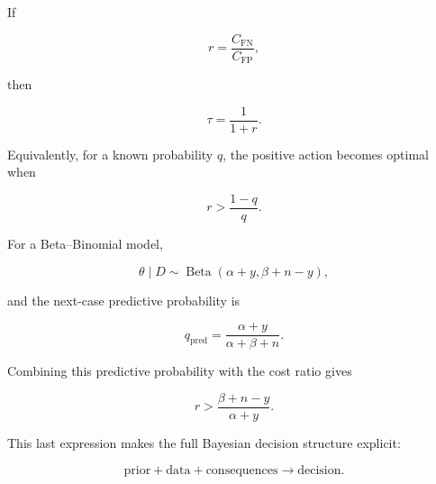 \documentclass[11pt]{article}
\newcommand{\CFP}{C_{\mathrm{FP}}}
\newcommand{\CFN}{C_{\mathrm{FN}}}
\begin{document}
If

\[
r=\frac{\CFN}{\CFP},
\]

then

\[
\boxed{
\tau=\frac{1}{1+r}.
}
\]

Equivalently, for a known probability $q$, the positive action becomes optimal when

\[
\boxed{
r>\frac{1-q}{q}.
}
\]

For a Beta--Binomial model,

\[
\theta\mid D
\sim
\operatorname{Beta}(\alpha+y,\beta+n-y),
\]

and the next-case predictive probability is

\[
\boxed{
q_{\mathrm{pred}}
=
\frac{\alpha+y}{\alpha+\beta+n}.
}
\]

Combining this predictive probability with the cost ratio gives

\[
\boxed{
r>
\frac{\beta+n-y}{\alpha+y}.
}
\]

This last expression makes the full Bayesian decision structure explicit:

\[
\boxed{
\text{prior}
+
\text{data}
+
\text{consequences}
\longrightarrow
\text{decision}.
}
\]
\end{document}
